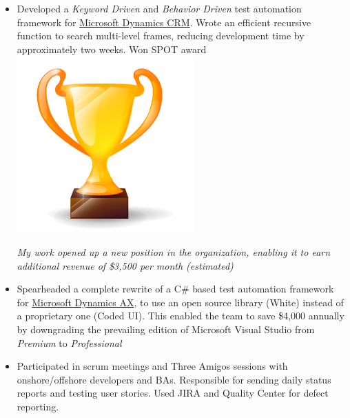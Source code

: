 \documentclass[letterpaper]{twentysecondcv} %
\begin{document}
\begin{twenty}
{\begin{itemize}
        \item Developed a \textit{Keyword Driven} and \textit{Behavior Driven} test automation framework for \href{https://www.microsoft.com/en-ca/dynamics/crm.aspx}{Microsoft Dynamics CRM}. Wrote an efficient recursive function to search multi-level frames, reducing development time by approximately two weeks. Won SPOT award {\includegraphics[scale=0.05]{img/trophy.png}}
        
        \textit{My work opened up a new position in the organization, enabling it to earn additional revenue of \$3,500 per month (estimated)}
        \item Spearheaded a complete rewrite of a C\# based test automation framework for \href{https://www.microsoft.com/en-ca/dynamics/erp-ax-overview.aspx}{Microsoft Dynamics AX}, to use an open source library (White) instead of a proprietary one (Coded UI). This enabled the team to save \$4,000 annually by downgrading the prevailing edition of Microsoft Visual Studio from \textit{Premium} to \textit{Professional}
        \item Participated in scrum meetings and Three Amigos sessions with onshore/offshore developers and BAs. Responsible for sending daily status reports and testing user stories. Used JIRA and Quality Center for defect reporting.
    \end{itemize}
    	}
        
\end{twenty}
\end{document}
